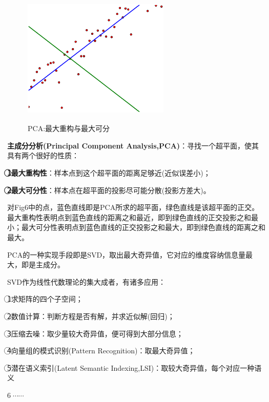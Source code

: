 \documentclass{article}
\begin{document}
\begin{CJK}{UTF8}{gbsn}
\begin{figure}[H]
\centering
\includegraphics[height=6.5cm,width=7cm]{./figs/fig6.eps}
\caption{PCA:最大重构与最大可分}
\label{6}
\end{figure}

	\textbf{主成分分析(Principal Component Analysis,PCA)}：寻找一个超平面，使其具有两个很好的性质：\par
	\textbf{\textcircled{1}最大重构性}：样本点到这个超平面的距离足够近(近似误差小)；\par
	\textbf{\textcircled{2}最大可分性}：样本点在超平面的投影尽可能分散(投影方差大)。\par
	对Fig6中的点，蓝色直线即是PCA所求的超平面，绿色直线是该超平面的正交。最大重构性表明点到蓝色直线的距离之和最近，即到绿色直线的正交投影之和最小；最大可分性表明点到蓝色直线的正交投影之和最大，即到绿色直线的距离之和最大。\par
	PCA的一种实现手段即是SVD，取出最大奇异值，它对应的维度容纳信息量最大，即是主成分。\par
	SVD作为线性代数理论的集大成者，有诸多应用：\par
	\textcircled{1}求矩阵的四个子空间；\par
	\textcircled{2}数值计算：判断方程是否有解，并求近似解(回归)；\par
	\textcircled{3}压缩去噪：取少量较大奇异值，便可得到大部分信息；\par
	\textcircled{4}向量组的模式识别(Pattern Recognition)：取最大奇异值；\par
	\textcircled{5}潜在语义索引(Latent Semantic Indexing,LSI)：取较大奇异值，每个对应一种语义\par
	\textcircled{6}$\cdots\cdots$
	
	
	
	
\end{CJK}
\end{document}
